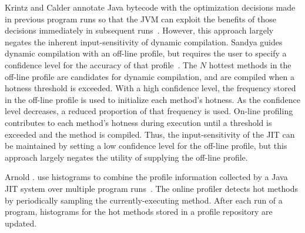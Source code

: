 Krintz and Calder annotate Java bytecode with the optimization
decisions made in previous program runs so that the JVM can exploit
the benefits of those decisions immediately in subsequent
runs~\cite{KrintzPLDI01}.  However, this approach largely negates the
inherent input-sensitivity of dynamic compilation.  %
Sandya guides dynamic compilation with an off-line
profile, but requires the user to specify a confidence level for the
accuracy of that profile~\cite{Sandya04}.  The $N$ hottest methods in
the off-line profile are candidates for dynamic compilation, and are
compiled when a hotness threshold is exceeded.  With a high confidence
level, the frequency stored in the off-line profile is used to
initialize each method's hotness.  As the confidence level decreases,
a reduced proportion of that frequency is used.  On-line profiling
contributes to each method's hotness during execution until a
threshold is exceeded and the method is compiled.  Thus, the
input-sensitivity of the JIT can be maintained by setting a low
confidence level for the off-line profile, but this approach largely
negates the utility of supplying the off-line profile.  %

Arnold \etal. use histograms to combine the profile information
collected by a Java JIT system over multiple program
runs~\cite{ArnoldOOPSLA05}.  The online profiler detects hot methods
by periodically sampling the currently-executing method.  After each
run of a program, histograms for the hot methods stored in a profile
repository are updated.  %

